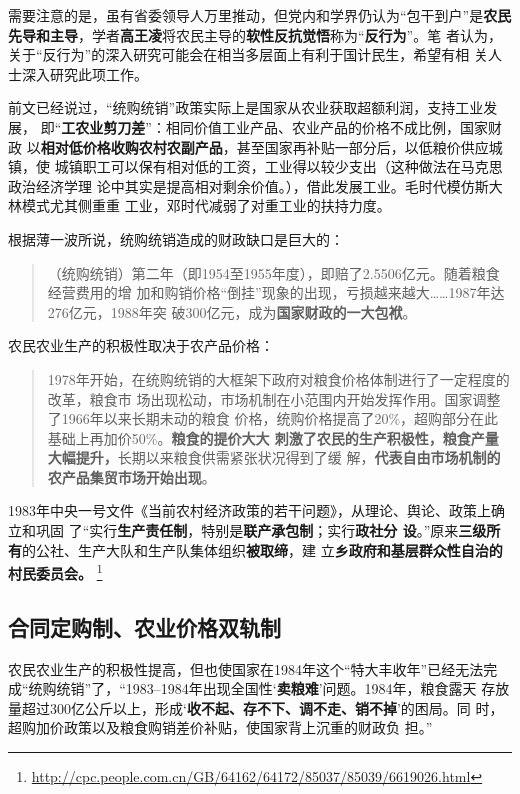 需要注意的是，虽有省委领导人万里推动，但党内和学界仍认为“包干到户”是\textbf{农民
  先导和主导}，学者\textbf{高王凌}将农民主导的\textbf{软性反抗觉悟}称为“\textbf{反行为}”。笔
者认为，关于“反行为”的深入研究可能会在相当多层面上有利于国计民生，希望有相
关人士深入研究此项工作。

前文已经说过，“统购统销”政策实际上是国家从农业获取超额利润，支持工业发展，
即“\textbf{工农业剪刀差}”：相同价值工业产品、农业产品的价格不成比例，国家财政
以\textbf{相对低价格收购农村农副产品}，甚至国家再补贴一部分后，以低粮价供应城镇，使
城镇职工可以保有相对低的工资，工业得以较少支出（这种做法在马克思政治经济学理
论中其实是提高相对剩余价值。），借此发展工业。毛时代模仿斯大林模式尤其侧重重
工业，邓时代减弱了对重工业的扶持力度。



根据薄一波所说，统购统销造成的财政缺口是巨大的：
\begin{quotation}
  （统购统销）第二年（即1954至1955年度），即赔了2.5506亿元。随着粮食经营费用的增
  加和购销价格“倒挂”现象的出现，亏损越来越大……1987年达276亿元，1988年突
  破300亿元，成为\textbf{国家财政的一大包袱}。
\end{quotation}

农民农业生产的积极性取决于农产品价格：
\begin{quotation}
  1978年开始，在统购统销的大框架下政府对粮食价格体制进行了一定程度的改革，粮食市
  场出现松动，市场机制在小范围内开始发挥作用。国家调整了1966年以来长期未动的粮食
  价格，统购价格提高了20\%，超购部分在此基础上再加价50\%。\textbf{粮食的提价大大
    刺激了农民的生产积极性，粮食产量大幅提升，}长期以来粮食供需紧张状况得到了缓
  解，\textbf{代表自由市场机制的农产品集贸市场开始出现}。\cite{taochangsheng}
\end{quotation}

1983年中央一号文件《当前农村经济政策的若干问题》，从理论、舆论、政策上确立和巩固
了“实行\textbf{生产责任制}，特别是\textbf{联产承包制}；实行\textbf{政社分
  设}。”原来\textbf{三级所有}的公社、生产大队和生产队集体组织\textbf{被取缔}，建
立\textbf{乡政府和基层群众性自治的村民委员会。}
\footnote{\url{http://cpc.people.com.cn/GB/64162/64172/85037/85039/6619026.html}}

\subsection{合同定购制、农业价格双轨制}
\label{sec:nongshuanggui}

农民农业生产的积极性提高，但也使国家在1984年这个“特大丰收年”已经无法完
成“统购统销”了，“1983--1984年出现全国性‘\textbf{卖粮难}’问题。1984年，粮食露天
存放量超过300亿公斤以上，形成‘\textbf{收不起、存不下、调不走、销不掉}’的困局。同
时，超购加价政策以及粮食购销差价补贴，使国家背上沉重的财政负
担。”\cite{liangshi40}

